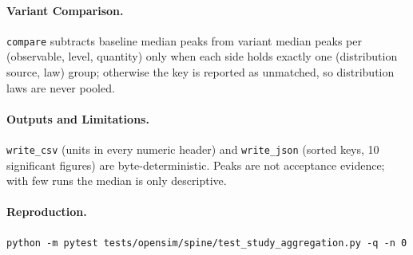 \paragraph{Variant Comparison.}
\texttt{compare} subtracts baseline median peaks from variant median peaks per
(observable, level, quantity) only when each side holds exactly one
(distribution source, law) group; otherwise the key is reported as unmatched,
so distribution laws are never pooled.

\paragraph{Outputs and Limitations.}
\texttt{write\_csv} (units in every numeric header) and \texttt{write\_json}
(sorted keys, 10 significant figures) are byte-deterministic. Peaks are not
acceptance evidence; with few runs the median is only descriptive.

\paragraph{Reproduction.}
\begin{verbatim}
python -m pytest tests/opensim/spine/test_study_aggregation.py -q -n 0
\end{verbatim}
